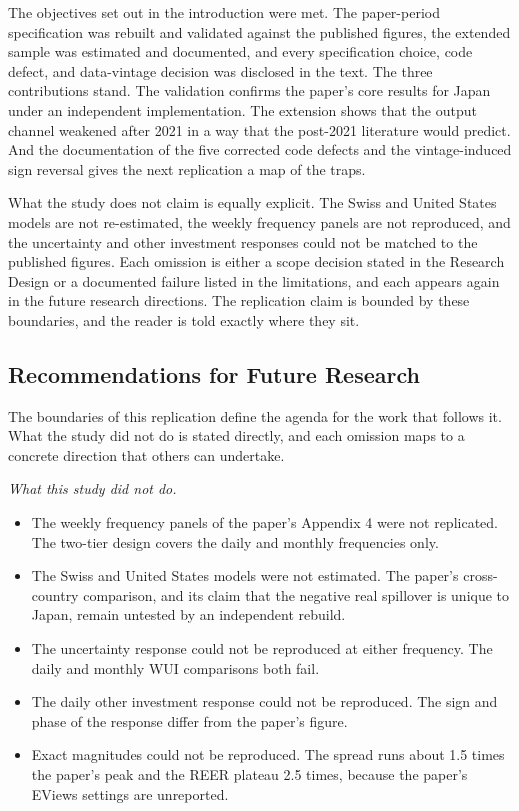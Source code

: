 The objectives set out in the introduction were met. The paper-period specification was rebuilt and validated against the published figures, the extended sample was estimated and documented, and every specification choice, code defect, and data-vintage decision was disclosed in the text. The three contributions stand. The validation confirms the paper's core results for Japan under an independent implementation. The extension shows that the output channel weakened after 2021 in a way that the post-2021 literature would predict. And the documentation of the five corrected code defects and the vintage-induced sign reversal gives the next replication a map of the traps.

What the study does not claim is equally explicit. The Swiss and United States models are not re-estimated, the weekly frequency panels are not reproduced, and the uncertainty and other investment responses could not be matched to the published figures. Each omission is either a scope decision stated in the Research Design or a documented failure listed in the limitations, and each appears again in the future research directions. The replication claim is bounded by these boundaries, and the reader is told exactly where they sit.

\subsection{Recommendations for Future Research}

The boundaries of this replication define the agenda for the work that follows it. What the study did not do is stated directly, and each omission maps to a concrete direction that others can undertake.

\textit{What this study did not do.}

\begin{itemize}
  \item The weekly frequency panels of the paper's Appendix 4 were not replicated. The two-tier design covers the daily and monthly frequencies only.
  \item The Swiss and United States models were not estimated. The paper's cross-country comparison, and its claim that the negative real spillover is unique to Japan, remain untested by an independent rebuild.
  \item The uncertainty response could not be reproduced at either frequency. The daily and monthly WUI comparisons both fail.
  \item The daily other investment response could not be reproduced. The sign and phase of the response differ from the paper's figure.
  \item Exact magnitudes could not be reproduced. The spread runs about 1.5 times the paper's peak and the REER plateau 2.5 times, because the paper's EViews settings are unreported.
\end{itemize}

